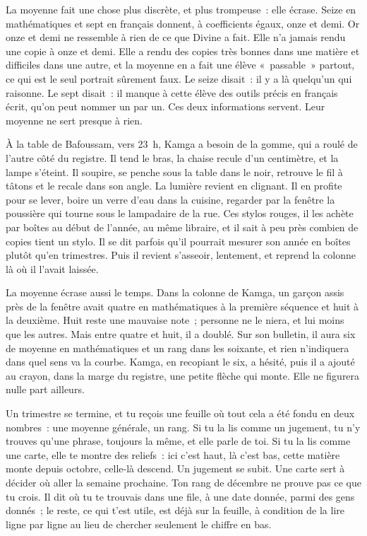\documentclass[10.5pt,twoside,openright]{book}
\begin{document}
La moyenne fait une chose plus discrète, et plus trompeuse : elle écrase. Seize en mathématiques et sept en français donnent, à coefficients égaux, onze et demi. Or onze et demi ne ressemble à rien de ce que Divine a fait. Elle n’a jamais rendu une copie à onze et demi. Elle a rendu des copies très bonnes dans une matière et difficiles dans une autre, et la moyenne en a fait une élève « passable » partout, ce qui est le seul portrait sûrement faux. Le seize disait : il y a là quelqu’un qui raisonne. Le sept disait : il manque à cette élève des outils précis en français écrit, qu’on peut nommer un par un. Ces deux informations servent. Leur moyenne ne sert presque à rien.

À la table de Bafoussam, vers 23 h, Kamga a besoin de la gomme, qui a roulé de l’autre côté du registre. Il tend le bras, la chaise recule d’un centimètre, et la lampe s’éteint. Il soupire, se penche sous la table dans le noir, retrouve le fil à tâtons et le recale dans son angle. La lumière revient en clignant. Il en profite pour se lever, boire un verre d’eau dans la cuisine, regarder par la fenêtre la poussière qui tourne sous le lampadaire de la rue. Ces stylos rouges, il les achète par boîtes au début de l’année, au même libraire, et il sait à peu près combien de copies tient un stylo. Il se dit parfois qu’il pourrait mesurer son année en boîtes plutôt qu’en trimestres. Puis il revient s’asseoir, lentement, et reprend la colonne là où il l’avait laissée.

La moyenne écrase aussi le temps. Dans la colonne de Kamga, un garçon assis près de la fenêtre avait quatre en mathématiques à la première séquence et huit à la deuxième. Huit reste une mauvaise note ; personne ne le niera, et lui moins que les autres. Mais entre quatre et huit, il a doublé. Sur son bulletin, il aura six de moyenne en mathématiques et un rang dans les soixante, et rien n’indiquera dans quel sens va la courbe. Kamga, en recopiant le six, a hésité, puis il a ajouté au crayon, dans la marge du registre, une petite flèche qui monte. Elle ne figurera nulle part ailleurs.

Un trimestre se termine, et tu reçois une feuille où tout cela a été fondu en deux nombres : une moyenne générale, un rang. Si tu la lis comme un jugement, tu n’y trouves qu’une phrase, toujours la même, et elle parle de toi. Si tu la lis comme une carte, elle te montre des reliefs : ici c’est haut, là c’est bas, cette matière monte depuis octobre, celle-là descend. Un jugement se subit. Une carte sert à décider où aller la semaine prochaine. Ton rang de décembre ne prouve pas ce que tu crois. Il dit où tu te trouvais dans une file, à une date donnée, parmi des gens donnés ; le reste, ce qui t’est utile, est déjà sur la feuille, à condition de la lire ligne par ligne au lieu de chercher seulement le chiffre en bas.
\end{document}
